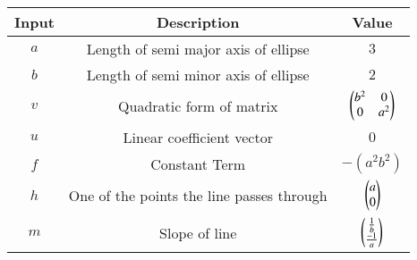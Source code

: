 \begin{tabular}[10pt]{ |c| c| c|}
    \hline
    \textbf{Input}&\textbf{Description}&\textbf{Value}\\
    \hline 
    $a$&Length of semi major axis of ellipse&$3$\\
    \hline
    $b$&Length of semi minor axis of ellipse&$2$\\
    \hline
    $v$&Quadratic form of matrix&$\begin{pmatrix}b^2&0\\0&a^2\end{pmatrix}$\\
    \hline 
    $u$&Linear coefficient vector&$0$\\
    \hline 
    $f$&Constant Term&$-(a^2b^2)$\\
    \hline
    $h$&One of the points the line passes through&$\begin{pmatrix}a\\0\end{pmatrix}$\\
    \hline
    $m$&Slope of line&$\begin{pmatrix}\frac{1}{b}\\\frac{-1}{a}\end{pmatrix}$\\
    \hline
    \end{tabular}
